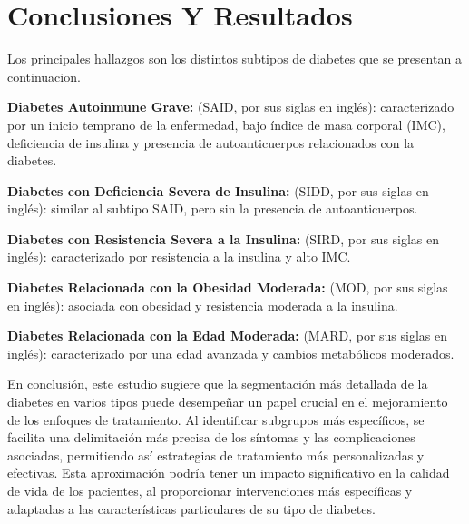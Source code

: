 \documentclass[12pt]{article}
\begin{document}
\section{Conclusiones Y Resultados}
Los principales hallazgos son los distintos subtipos de diabetes que se presentan a continuacion.

\textbf{Diabetes Autoinmune Grave:} (SAID, por sus siglas en inglés): caracterizado por un inicio temprano de la enfermedad, bajo índice de masa corporal (IMC), deficiencia de insulina y presencia de autoanticuerpos relacionados con la diabetes.

\textbf{Diabetes con Deficiencia Severa de Insulina:} (SIDD, por sus siglas en inglés): similar al subtipo SAID, pero sin la presencia de autoanticuerpos.

\textbf{Diabetes con Resistencia Severa a la Insulina:} (SIRD, por sus siglas en inglés): caracterizado por resistencia a la insulina y alto IMC.

\textbf{Diabetes Relacionada con la Obesidad Moderada:} (MOD, por sus siglas en inglés): asociada con obesidad y resistencia moderada a la insulina.

\textbf{Diabetes Relacionada con la Edad Moderada:} (MARD, por sus siglas en inglés): caracterizado por una edad avanzada y cambios metabólicos moderados.

En conclusión, este estudio sugiere que la segmentación más detallada de la diabetes en varios tipos puede desempeñar un papel crucial en el mejoramiento de los enfoques de tratamiento. Al identificar subgrupos más específicos, se facilita una delimitación más precisa de los síntomas y las complicaciones asociadas, permitiendo así estrategias de tratamiento más personalizadas y efectivas. Esta aproximación podría tener un impacto significativo en la calidad de vida de los pacientes, al proporcionar intervenciones más específicas y adaptadas a las características particulares de su tipo de diabetes.
\end{document}

